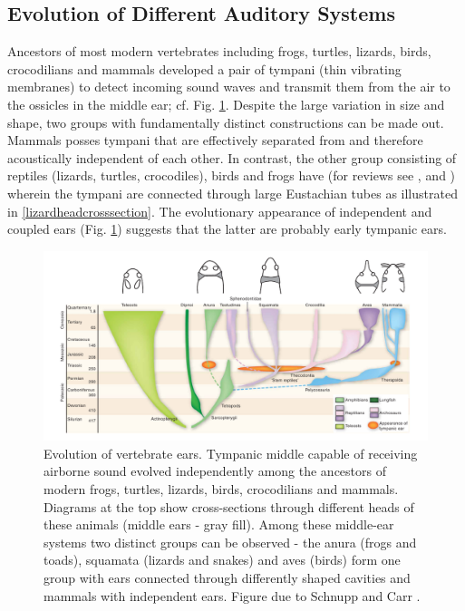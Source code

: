 \subsection{Evolution of Different Auditory Systems}
Ancestors of most modern vertebrates including frogs, turtles, lizards, birds, crocodilians and mammals
developed a pair of tympani (thin vibrating membranes) to detect incoming sound waves and transmit
them from the air to the ossicles in the middle ear; cf. Fig. \ref{vertebrateearevolution}. 
Despite the large variation in size and shape, two groups with fundamentally distinct constructions can be
made out. Mammals posses tympani that are effectively separated from and therefore acoustically 
independent of each other. In contrast, the other group consisting of reptiles (lizards, turtles, crocodiles), birds and frogs
have  (for reviews see \cite{carrsoares}, \cite{dalsgaardcarr} and \cite{schnuppcarr}) wherein
the tympani are connected through large Eustachian tubes as illustrated in \ref{lizardheadcrosssection}. The evolutionary 
appearance of independent and coupled ears (Fig. \ref{vertebrateearevolution}) suggests that the latter are probably early
tympanic ears.
\begin{figure}[ht!]
 \includegraphics[width=1.0\linewidth]{Diagrams/vertebrateearevolution.png}
 \caption[Vertebrate Ear Evolution]{Evolution of vertebrate ears. Tympanic
 middle capable of receiving airborne sound evolved independently among the ancestors of modern frogs, turtles, lizards, birds,
 crocodilians and mammals. Diagrams at the top show cross-sections through different heads of these animals (middle ears - gray fill).
 Among these middle-ear systems two distinct groups can be observed - the anura (frogs and toads), squamata (lizards and snakes)
 and aves (birds) form one group with ears connected through differently shaped cavities and mammals with independent ears. Figure due to Schnupp and Carr \cite{schnuppcarr}.}
 \label{vertebrateearevolution}
\end{figure}

